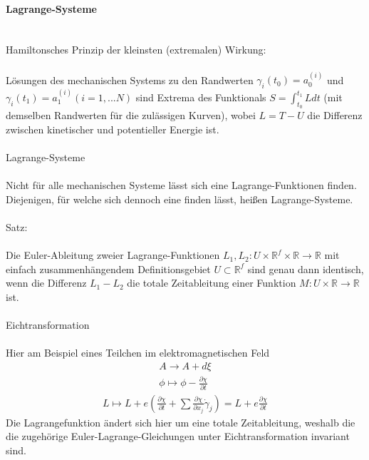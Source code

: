 \documentclass[10pt,a4paper]{article}
\begin{document}
\paragraph{Lagrange-Systeme} $\,$ \\
\\
Hamiltonsches Prinzip der kleinsten (extremalen) Wirkung:\\
\\
Lösungen des mechanischen Systems zu den Randwerten $\gamma_i (t_0)=a_0^{(i)} $ und $ \gamma_i (t_1)=a_1^{(i)} (i=1,...N) $ sind Extrema des Funktionals $ S=\int_{t_0}^{t_1} Ldt $ (mit demselben Randwerten für die zulässigen Kurven), wobei $L=T-U$ die Differenz zwischen kinetischer und potentieller Energie ist.\\
\\
Lagrange-Systeme\\
\\
Nicht für alle mechanischen Systeme lässt sich eine Lagrange-Funktionen finden. Diejenigen, für welche sich dennoch eine finden lässt, heißen Lagrange-Systeme.\\
\\
Satz:\\
\\
Die Euler-Ableitung zweier Lagrange-Funktionen $L_1, L_2: U \times \mathbb{R}^f \times \mathbb{R} \longrightarrow \mathbb{R} $ mit einfach zusammenhängendem Definitionsgebiet $ U \subset \mathbb{R}^f $ sind genau dann identisch, wenn die Differenz $ L_1-L_2 $ die totale Zeitableitung einer Funktion $ M: U \times \mathbb{R} \longrightarrow \mathbb{R}$ ist.\\
\\
Eichtransformation \\
\\
Hier am Beispiel eines Teilchen im elektromagnetischen Feld 
\begin{align}
A \longrightarrow A + d \xi \\
\phi \longmapsto \phi -\frac{\partial \chi}{\partial t}
\end{align}
\begin{align}
L \longmapsto L+ e (\frac{\partial \chi}{\partial t} + \sum \frac{\partial \chi}{\partial x_j} \dot{\gamma}_j)=L+e \frac{\partial \chi}{\partial t} 
\end{align}
Die Lagrangefunktion ändert sich hier um eine totale Zeitableitung, weshalb die die zugehörige Euler-Lagrange-Gleichungen unter Eichtransformation invariant sind.
\end{document}
